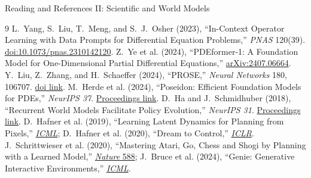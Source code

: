 \documentclass[aspectratio=169,11pt]{beamer}
\begin{document}
\begin{frame}{Reading and References II: Scientific and World Models}
\scriptsize
\begin{thebibliography}{9}
L.~Yang, S.~Liu, T.~Meng, and S.~J.~Osher (2023),
``In-Context Operator Learning with Data Prompts for Differential Equation Problems,'' \emph{PNAS} 120(39).
\href{https://doi.org/10.1073/pnas.2310142120}{doi:10.1073/pnas.2310142120}.
Z.~Ye et al. (2024), ``PDEformer-1: A Foundation Model for One-Dimensional Partial Differential Equations,''
\href{https://arxiv.org/abs/2407.06664}{arXiv:2407.06664}.
Y.~Liu, Z.~Zhang, and H.~Schaeffer (2024), ``PROSE,'' \emph{Neural Networks} 180, 106707.
\href{https://doi.org/10.1016/j.neunet.2024.106707}{doi link}.
M.~Herde et al. (2024), ``Poseidon: Efficient Foundation Models for PDEs,'' \emph{NeurIPS 37}.
\href{https://proceedings.neurips.cc/paper_files/paper/2024/hash/84e1b1ec17bb11c57234e96433022a9a-Abstract-Conference.html}{Proceedings link}.
D.~Ha and J.~Schmidhuber (2018), ``Recurrent World Models Facilitate Policy Evolution,'' \emph{NeurIPS 31}.
\href{https://papers.nips.cc/paper_files/paper/2018/hash/2de5d16682c3c35007e4e92982f1a2ba-Abstract.html}{Proceedings link}.
D.~Hafner et al. (2019), ``Learning Latent Dynamics for Planning from Pixels,''
\href{https://proceedings.mlr.press/v97/hafner19a.html}{\emph{ICML}};
D.~Hafner et al. (2020), ``Dream to Control,''
\href{https://openreview.net/forum?id=S1lOTC4tDS}{\emph{ICLR}}.
J.~Schrittwieser et al. (2020), ``Mastering Atari, Go, Chess and Shogi by Planning with a Learned Model,''
\href{https://doi.org/10.1038/s41586-020-03051-4}{\emph{Nature} 588};
J.~Bruce et al. (2024), ``Genie: Generative Interactive Environments,''
\href{https://proceedings.mlr.press/v235/bruce24a.html}{\emph{ICML}}.
\end{thebibliography}

\end{frame}
\end{document}

